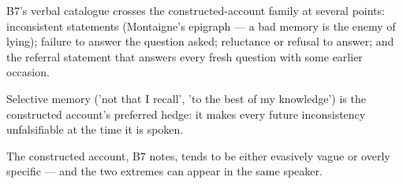 

\begin{distilled}
  \item B7's verbal catalogue crosses the constructed-account family at several points: inconsistent statements (Montaigne's epigraph --- a bad memory is the enemy of lying); failure to answer the question asked; reluctance or refusal to answer; and the referral statement that answers every fresh question with some earlier occasion.
  \item Selective memory ('not that I recall', 'to the best of my knowledge') is the constructed account's preferred hedge: it makes every future inconsistency unfalsifiable at the time it is spoken.
  \item The constructed account, B7 notes, tends to be either evasively vague or overly specific --- and the two extremes can appear in the same speaker.
\end{distilled}
